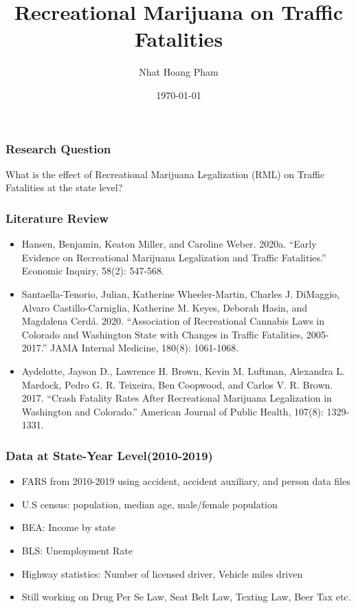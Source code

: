 \documentclass{beamer}
\title{Recreational Marijuana on Traffic Fatalities}
\author{Nhat Hoang Pham	}
\institute{UC Denver}
\date{\today}
\begin{document}
\frame{\titlepage}

\begin{frame} %
\frametitle{Research Question}
	What is the effect of Recreational Marijuana Legalization (RML)  on Traffic Fatalities at the state level? 
\end{frame} 

\begin{frame} %
\frametitle{Literature Review}
	\begin{itemize}
	
		\item 
		Hansen, Benjamin, Keaton Miller, and Caroline Weber. 2020a. “Early Evidence on Recreational Marijuana Legalization and Traffic Fatalities.” Economic Inquiry, 58(2): 547-568. \pause
		
		\item
		Santaella-Tenorio, Julian, Katherine Wheeler-Martin, Charles J. DiMaggio, Alvaro Castillo-Carniglia, Katherine M. Keyes, Deborah Hasin, and Magdalena Cerdá. 2020. “Association of Recreational Cannabis Laws in Colorado and Washington State with Changes in Traffic Fatalities, 2005-2017.” JAMA Internal Medicine, 180(8): 1061-1068. \pause
		
		\item
		Aydelotte, Jayson D., Lawrence H. Brown, Kevin M. Luftman, Alexandra L. Mardock, Pedro G. R. Teixeira, Ben Coopwood, and Carlos V. R. Brown. 2017. “Crash Fatality Rates After Recreational Marijuana Legalization in Washington and Colorado.” American Journal of Public Health, 107(8): 1329- 1331. \pause
		
	\end{itemize}
\end{frame} 

\begin{frame} %
\frametitle{Data at State-Year Level(2010-2019)}
	\begin{itemize}
	
		\item
		FARS from 2010-2019 using accident, accident auxiliary, and person data files
		\item
		U.S census: population, median age, male/female population
		\item
		BEA: Income by state
		\item
		BLS: Unemployment Rate
		\item
		Highway statistics: Number of licensed driver, Vehicle miles driven 		
		\item
		Still working on Drug Per Se Law, Seat Belt Law, Texting Law, Beer Tax etc. 
		
	\end{itemize}
\end{frame} 
\end{document}
